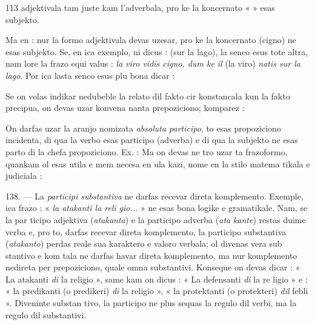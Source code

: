 \begin{VUpage}[117]{113}
\VUcontinue
adjektivala tam juste kam l'adverbala, pro ke la koncernato\nl
«  » esas subjekto.

Ma en :  nur la\nl
formo adjektivala devas uzesar, pro ke la koncernato (cigno)\nl
ne esas subjekto. Se, en ica exemplo, ni dicus :  (sur\nl
la lago), la senco esus tote altra, nam lore la frazo equi\cc
valus : \textit{la viro vidis cigno, dum ke il} (la viro) \textit{natis sur la}\nl
\textit{lago}. Por ica lasta senco esus plu bona dicar : \nl
{}

Se on volas indikar nedubeble la relato dil fakto cir\cc
konstancala kun la fakto precipua, on devas uzar konvena\cc
nanta prepoziciono; komparez : \nl
{}

On darfas uzar la aranjo nomizata \textit{absoluta participo}, to\nl
esas propoziciono incidenta, di qua la verbo esas participo\nl
(adverba) e di qua la subjekto ne esas parto di la chefa\nl
propoziciono. Ex. : \nl
Ma on devas ne tro uzar ta frazoformo, quankam ol esas\nl
utila e mem necesa en ula kazi, nome en la stilo matema\cc
tikala e judiciala : \nl
{}

\VUblanc{7.64pt}%
138. --- La \textit{participi substantiva} ne darfas recevar direta\nl
komplemento. Exemple, ica frazo : « \textit{la atakanti la reli}\cc
\textit{gio...} » ne esas bona logike e gramatikale. Nam, se la par\cc
ticipo adjektiva (\textit{atakanta}) e la participo adverba (\textit{ata}\cc
\textit{kante}) restas duime verba e, pro to, darfas recevar direta\nl
komplemento, la participo substantiva (\textit{atakanto}) perdas\nl
reale sua karaktero e valoro verbala; ol divenas vera sub\cc
stantivo e kom tala ne darfas havar direta komplemento,\nl
ma nur komplemento nedireta per prepoziciono, quale omna\nl
substantivi. Konseque on devas dicar : « La atakanti \textit{di} la\nl
religio », same kam on dicus : « La defensanti \textit{di} la re\cc
ligio » e : « la predikanti (o predikeri) \textit{di} la religio », « la\nl
protektanti (o protekteri) \textit{dil} febli ». Diveninte substan\cc
tivo, la participo ne plus sequas la regulo dil verbi, ma la\nl
regulo dil substantivi.


\end{VUpage}
